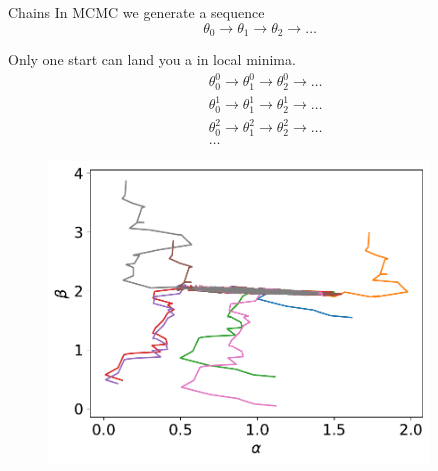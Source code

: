 \documentclass[
aspectratio=169,
14pt,
professionalfonts
]{beamer}
\begin{document}
\begin{frame}{Chains}
    In MCMC we generate a sequence
    $$
    \theta_0 \to \theta_1 \to \theta_2 \to \ldots
    $$
    \begin{minipage}{0.49\textwidth}
        Only one start can land you a in local minima.
        \begin{align*}
            &\theta_0^0 \to \theta_1^0 \to \theta_2^0 \to \ldots \\
            &\theta_0^1 \to \theta_1^1 \to \theta_2^1 \to \ldots \\
            &\theta_0^2 \to \theta_1^2 \to \theta_2^2 \to \ldots \\
            &\ldots
        \end{align*}
    \end{minipage}
    \begin{minipage}{0.49\textwidth}
        \begin{figure}
            \centering
            \includegraphics[width=0.9\textwidth]{../plots/chain_walk.pdf}
        \end{figure}
    \end{minipage}

\end{frame}
\end{document}

